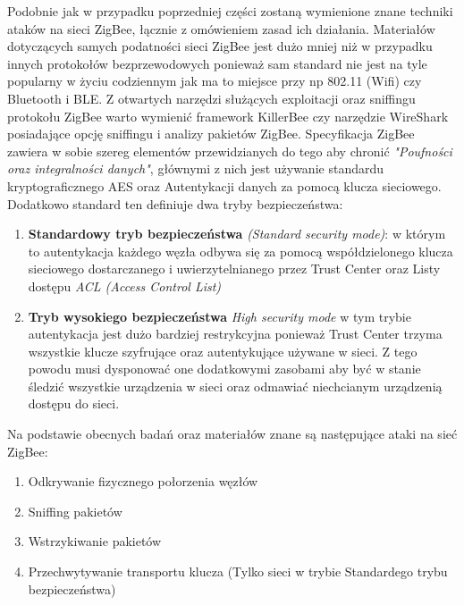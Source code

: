 Podobnie jak w przypadku poprzedniej części zostaną wymienione znane techniki ataków na sieci ZigBee, łącznie z omówieniem zasad ich działania.
Materiałów dotyczących samych podatności sieci ZigBee jest dużo mniej niż w przypadku innych protokołów bezprzewodowych ponieważ sam standard nie jest na tyle popularny w życiu codziennym jak ma to miejsce przy np 802.11 (Wifi) czy Bluetooth i BLE. Z otwartych narzędzi służących exploitacji oraz sniffingu protokołu ZigBee warto wymienić framework KillerBee czy narzędzie WireShark posiadające opcję sniffingu i analizy pakietów ZigBee.
Specyfikacja ZigBee zawiera w sobie szereg elementów przewidzianych do tego aby chronić \textit{"Poufności oraz integralności danych"}, głównymi z nich jest używanie standardu kryptograficznego AES oraz Autentykacji danych za pomocą klucza sieciowego. Dodatkowo standard ten definiuje dwa tryby bezpieczeństwa:
\begin{enumerate}
	\item \textbf{Standardowy tryb bezpieczeństwa} \textit{(Standard security mode)}: w którym to autentykacja każdego węzła odbywa się za pomocą współdzielonego klucza sieciowego dostarczanego i uwierzytelnianego przez Trust Center oraz Listy dostępu \textit{ACL (Access Control List)}
	\item \textbf{Tryb wysokiego bezpieczeństwa} \textit{High security mode} w tym trybie autentykacja jest dużo bardziej restrykcyjna ponieważ Trust Center trzyma wszystkie klucze szyfrujące oraz autentykujące używane w sieci. Z tego powodu musi dysponować one dodatkowymi zasobami aby być w stanie śledzić wszystkie urządzenia w sieci oraz odmawiać niechcianym urządzenią dostępu do sieci.	
\end{enumerate} 

Na podstawie obecnych badań oraz materiałów znane są następujące ataki na sieć ZigBee:
\begin{enumerate}
	\item Odkrywanie fizycznego połorzenia węzłów
	\item Sniffing pakietów
	\item Wstrzykiwanie pakietów
	\item Przechwytywanie transportu klucza (Tylko sieci w trybie Standardego trybu bezpieczeństwa)
\end{enumerate} 


